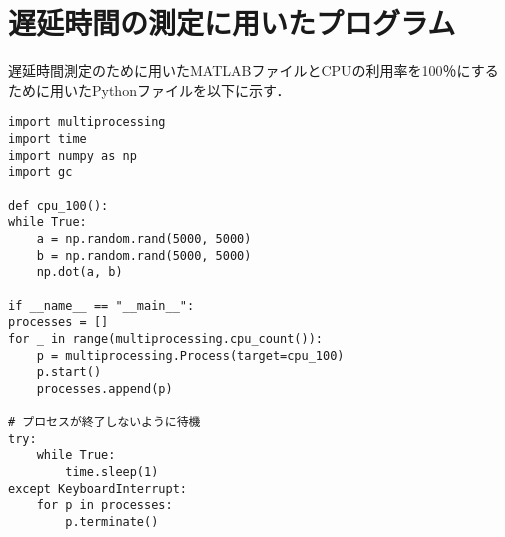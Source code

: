 \chapter{遅延時間の測定に用いたプログラム}
遅延時間測定のために用いたMATLABファイルとCPUの利用率を100％にするために用いたPythonファイルを以下に示す．

\begin{lstlisting}[caption=cpu100.py]
import multiprocessing
import time
import numpy as np
import gc

def cpu_100():
while True:
    a = np.random.rand(5000, 5000)
    b = np.random.rand(5000, 5000)
    np.dot(a, b)

if __name__ == "__main__":
processes = []
for _ in range(multiprocessing.cpu_count()):
    p = multiprocessing.Process(target=cpu_100)
    p.start()
    processes.append(p)

# プロセスが終了しないように待機
try:
    while True:
        time.sleep(1)
except KeyboardInterrupt:
    for p in processes:
        p.terminate()

\end{lstlisting}
    
